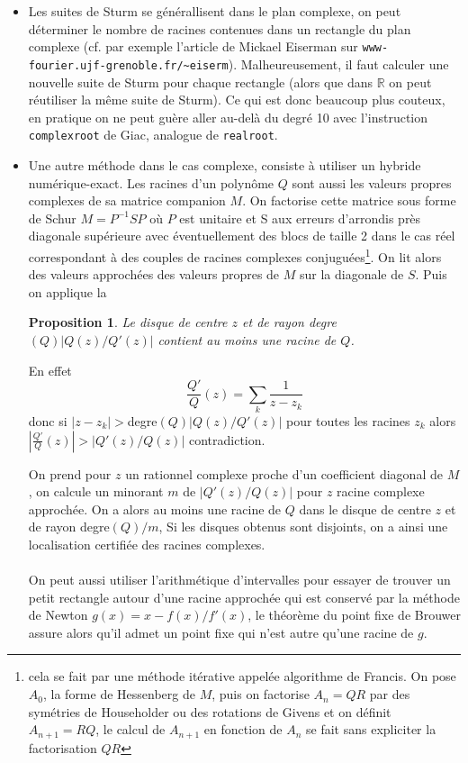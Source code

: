 \documentclass[a4paper,11pt]{article}
\newtheorem{prop}[thm]{Proposition}
\newcommand{\R}{{\mathbb{R}}}
\begin{document}
\begin{giacjshere}
\begin{itemize}
On peut m\^eme montrer que $r(P)$ et $\sigma(P)$ sont de m\^eme
parit\'e.
L'algorithme VAS utilise ce r\'esultat et des changements de variable
homographique $x \rightarrow \frac{ax+b}{cx+d}$ pour isoler les racines.
\item Les suites de Sturm se g\'en\'erallisent dans le plan complexe, on
peut d\'eterminer le nombre de racines contenues dans un
rectangle du plan complexe (cf. par exemple l'article
de Mickael Eiserman sur \verb|www-fourier.ujf-grenoble.fr/~eiserm|). 
Malheureusement, il faut calculer une nouvelle suite de Sturm
pour chaque rectangle (alors que dans $\R$ on peut r\'eutiliser la
m\^eme suite de Sturm). Ce qui est donc beaucoup plus couteux,
en pratique on ne peut gu\`ere aller au-del\`a du degr\'e 10 avec
l'instruction \verb|complexroot| de Giac, analogue de \verb|realroot|.
\item Une autre m\'ethode dans le cas complexe, 
consiste \`a utiliser
un hybride num\'erique-exact. Les racines d'un polyn\^ome $Q$
sont aussi les valeurs
propres complexes de sa matrice companion $M$. On factorise cette matrice
sous forme de Schur $M=P^{-1} S P$ o\`u $P$ est unitaire
et S  aux erreurs d'arrondis pr\`es diagonale sup\'erieure 
avec \'eventuellement des blocs de taille
2 dans le cas r\'eel correspondant \`a des couples de racines
complexes conjugu\'ees\footnote{cela se fait
par une m\'ethode it\'erative appel\'ee algorithme
de Francis. On pose $A_0$, la forme
de Hessenberg de $M$, puis on 
factorise $A_n=QR$ par des sym\'etries de Householder ou
des rotations de Givens et on d\'efinit
$A_{n+1}=RQ$, le calcul de $A_{n+1}$ en fonction de $A_n$
se fait sans expliciter la factorisation $QR$}. On lit alors des valeurs approch\'ees des valeurs
propres de $M$ sur la diagonale de $S$. Puis on applique la
\begin{prop}
Le disque de centre $z$ et de rayon degre$(Q) |Q(z)/Q'(z)|$
contient au moins une racine de $Q$.
\end{prop}
En effet
\[ \frac{Q'}{Q}(z)= \sum_{k} \frac{1}{z-z_k}\]
donc si $|z-z_k| > $degre$(Q) |Q(z)/Q'(z)|$ pour toutes les racines $z_k$ alors
$|\frac{Q'}{Q}(z)| > |Q'(z)/Q(z)|$ contradiction.

On prend pour $z$ un rationnel complexe proche d'un coefficient
diagonal de $M$, on calcule un minorant $m$ de $|Q'(z)/Q(z)|$ 
pour $z$ racine complexe approch\'ee. On a alors au moins
une racine de $Q$ dans le disque de centre $z$ 
et de rayon degre$(Q)/m$, Si les disques obtenus sont
disjoints, on a ainsi une localisation certifi\'ee des racines
complexes.\\
\\
On peut aussi utiliser l'arithmétique d'intervalles pour
essayer de trouver un petit rectangle autour d'une racine approchée
qui est conservé par la méthode de Newton $g(x)=x-f(x)/f'(x)$,
le théorème du point fixe de Brouwer assure alors qu'il admet
un point fixe qui n'est autre qu'une racine de $g$.
\end{itemize}


\end{giacjshere}
\end{document}
